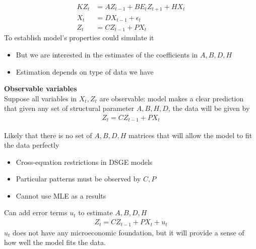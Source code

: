 \documentclass{beamer}
\begin{document}
\begin{frame}
 \begin{align*}  
 KZ_t &= AZ_{t-1} + BE_tZ_{t+1} + HX_t\\
 X_t&=DX_{t-1}+\epsilon_t\\  
 Z_t&=CZ_{t-1}+PX_t 
\end{align*}
 To establish model's properties could simulate it
 \begin{itemize}
   \item But we are interested in the estimates of the coefficients in $A, B, D, H$
   \item Estimation depends on type of data we have
 \end{itemize} 
\end{frame}


\begin{frame}
  \textbf{Observable variables}\\
  Suppose all variables in $X_t,Z_t$ are observable: model makes a clear prediction that given any set of structural parameter $A,B,H,D$, the data will be given by
\begin{align*}  
  Z_t=CZ_{t-1}+PX_t 
\end{align*}
\end{frame}

\begin{frame}
  Likely that there is no set of $A,B,D,H$ matrices that will allow the model to fit the data perfectly
  \begin{itemize}
    \item Cross-equation restrictions in DSGE models
    \item Particular patterns must be observed by $C,P$
    \item Cannot use MLE as a results
  \end{itemize}
  Can add error terms $u_t$ to estimate $A, B, D, H$ 
\begin{align}
  Z_t=CZ_{t-1} + PX_t + u_t
\end{align}
$u_t$ does not have any microeconomic foundation, but it will provide a sense of how well the model fits the data.
\end{frame}
\end{document}
